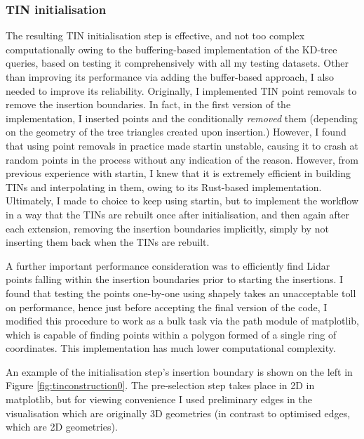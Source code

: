 \subsubsection{TIN initialisation}

The resulting TIN initialisation step is effective, and not too complex computationally owing to the buffering-based implementation of the KD-tree queries, based on testing it comprehensively with all my testing datasets. Other than improving its performance via adding the buffer-based approach, I also needed to improve its reliability. Originally, I implemented TIN point removals to remove the insertion boundaries. In fact, in the first version of the implementation, I inserted points and the conditionally \textit{removed} them (depending on the geometry of the tree triangles created upon insertion.) However, I found that using point removals in practice made startin unstable, causing it to crash at random points in the process without any indication of the reason. However, from previous experience with startin, I knew that it is extremely efficient in building TINs and interpolating in them, owing to its Rust-based implementation. Ultimately, I made to choice to keep using startin, but to implement the workflow in a way that the TINs are rebuilt once after initialisation, and then again after each extension, removing the insertion boundaries implicitly, simply by not inserting them back when the TINs are rebuilt.

A further important performance consideration was to efficiently find Lidar points falling within the insertion boundaries prior to starting the insertions. I found that testing the points one-by-one using shapely takes an unacceptable toll on performance, hence just before accepting the final version of the code, I modified this procedure to work as a bulk task via the path module of matplotlib, which is capable of finding points within a polygon formed of a single ring of coordinates. This implementation has much lower computational complexity.

An example of the initialisation step's insertion boundary is shown on the left in Figure \ref{fig:tinconstruction0}. The pre-selection step takes place in 2D in matplotlib, but for viewing convenience I used preliminary edges in the visualisation which are originally 3D geometries (in contrast to optimised edges, which are 2D geometries).

